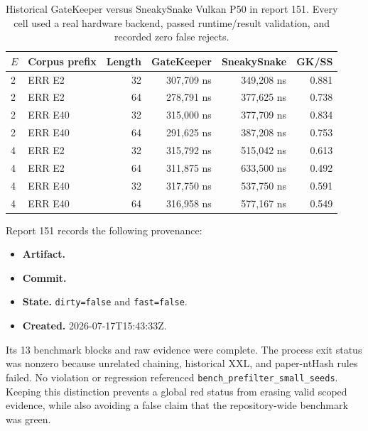 \begin{table}[htbp]
\centering
\small
\begin{tabular}{llrrrr}
\textbf{\(E\)} & \textbf{Corpus prefix} & \textbf{Length} &
\textbf{GateKeeper} & \textbf{SneakySnake} & \textbf{GK/SS}\\
\hline
2 & ERR E2  & 32 & 307,709 ns & 349,208 ns & 0.881\\
2 & ERR E2  & 64 & 278,791 ns & 377,625 ns & 0.738\\
2 & ERR E40 & 32 & 315,000 ns & 377,709 ns & 0.834\\
2 & ERR E40 & 64 & 291,625 ns & 387,208 ns & 0.753\\
4 & ERR E2  & 32 & 315,792 ns & 515,042 ns & 0.613\\
4 & ERR E2  & 64 & 311,875 ns & 633,500 ns & 0.492\\
4 & ERR E40 & 32 & 317,750 ns & 537,750 ns & 0.591\\
4 & ERR E40 & 64 & 316,958 ns & 577,167 ns & 0.549\\
\end{tabular}
\caption{Historical GateKeeper versus SneakySnake Vulkan P50 in report 151.
Every cell used a real hardware backend, passed runtime/result validation, and
recorded zero false rejects.}
\label{tab:gatekeeper-report151}
\end{table}

Report 151 records the following provenance:

\begin{itemize}
    \item \textbf{Artifact.}\\
    \item \textbf{Commit.}\\
    \item \textbf{State.} \texttt{dirty=false} and \texttt{fast=false}.
    \item \textbf{Created.} 2026-07-17T15:43:33Z.
\end{itemize}

Its 13 benchmark blocks and raw evidence were complete.
The process exit status was nonzero because unrelated chaining, historical XXL,
and paper-ntHash rules failed.  No violation or regression referenced
\texttt{bench\_prefilter\_small\_seeds}.  Keeping this distinction prevents a
global red status from erasing valid scoped evidence, while also avoiding a
false claim that the repository-wide benchmark was green.

